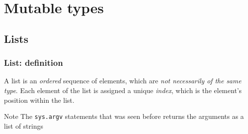 \section{Mutable types}
\subsection{Lists}

\begin{frame}[fragile]
    \frametitle{List: definition}
    A list is an \emph{ordered} sequence of elements, which are \emph{not necessarily of the same type}. Each element of the list is assigned a unique \emph{index}, which is the element's position within the list.
   
    

    \begin{block}{Note}
        The \verb+sys.argv+ statements that was seen before returns the arguments as a list of strings
    \end{block}

\end{frame}

